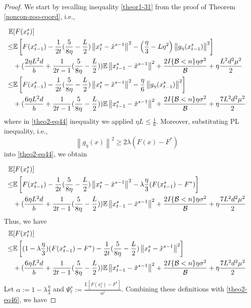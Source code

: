 \documentclass{article}
\newcommand*{\E}{\mathbb{E}}
\newcommand{\norm}[1]{\left\lVert#1\right\rVert}
\theoremstyle{definition}
\theoremstyle{remark}
\begin{document}
\begin{proof}
We start by recalling inequality \eqref{theor1-31} from the proof of Theorem \ref{noncon-zoo-coord}, i.e.,

\begin{align} 
\E&[F({x}_{t}^s)] \notag
\\ \leq& \E\left[F({x}_{t-1}^s)  -\frac{1}{2t}(\frac{5}{8\eta} - \frac{L}{2})\norm{{x}_t^s-\tilde{x}^{s-1}}^2- \left(\frac{\eta}{3}-L\eta^2\right)\norm{g_{\eta}(x_{t-1}^s)}^2\right]\notag\\
&+(\frac{2\eta L^2 d}{b}+\frac{1}{2t-1}(\frac{5}{8\eta} - \frac{L}{2}))\E\norm{x_{t-1}^s-\tilde{x}^{s-1}}^2
+ \frac{2I\{\mathcal{B} < n\}\eta \sigma ^2}{\mathcal{B}}+\eta \frac{L^2 d^2 \mu^2}{2}\notag
\\ \leq& \E\left[F({x}_{t-1}^s)  -\frac{1}{2t}(\frac{5}{8\eta} - \frac{L}{2})\norm{{x}_t^s-\tilde{x}^{s-1}}^2- \frac{\eta}{6}\norm{g_{\eta}(x_{t-1}^s)}^2\right]\notag\\
&+(\frac{6\eta L^2 d}{b}+\frac{1}{2t-1}(\frac{5}{8\eta} - \frac{L}{2}))\E\norm{x_{t-1}^s-\tilde{x}^{s-1}}^2
+ \frac{2I\{\mathcal{B} < n\}\eta \sigma ^2}{\mathcal{B}}+\eta \frac{7 L^2 d^2 \mu^2}{2}\label{theo2-eq44}
 \end{align}
 where in \eqref{theo2-eq44} inequality we applied $\eta L \leq \frac{1}{6}$.
Moreover, substituting PL inequality, i.e., 
\begin{equation}
\norm{g_{\eta}(x)}^2 \geq 2\lambda (F(x) - F^*)
\end{equation}
into \eqref{theo2-eq44}, we obtain

\begin{align} 
\E&[F({x}_{t}^s)] \notag
\\ \leq& \E\left[F({x}_{t-1}^s)  -\frac{1}{2t}(\frac{5}{8\eta} - \frac{L}{2})\norm{{x}_t^s-\tilde{x}^{s-1}}^2- \lambda\frac{\eta}{3}(F({x}_{t-1}^s) - F^*) \right]\notag\\
&+(\frac{6\eta L^2 d}{b}+\frac{1}{2t-1}(\frac{5}{8\eta} - \frac{L}{2}))\E\norm{x_{t-1}^s-\tilde{x}^{s-1}}^2
+ \frac{2I\{\mathcal{B} < n\}\eta \sigma ^2}{\mathcal{B}}+\eta \frac{7 L^2 d^2 \mu^2}{2}
 \end{align}
Thus, we have
\begin{align} 
\E&[F({x}_{t}^s)] \notag
\\ \leq& \E\left[ (1-\lambda\frac{\eta}{3})(F({x}_{t-1}^s) - F^*)   -\frac{1}{2t}(\frac{5}{8\eta} - \frac{L}{2})\norm{{x}_t^s-\tilde{x}^{s-1}}^2\right]\notag\\
&+(\frac{6 \eta L^2 d}{b}+\frac{1}{2t-1}(\frac{5}{8\eta} - \frac{L}{2}))\E\norm{x_{t-1}^s-\tilde{x}^{s-1}}^2
+ \frac{2I\{\mathcal{B} < n\}\eta \sigma ^2}{\mathcal{B}}+\eta \frac{7 L^2 d^2 \mu^2}{2}\label{theo2-eq46}
 \end{align}
Let $\alpha := 1 - \lambda\frac{\eta}{3}$ and $\Psi_t^s := \frac{\E[F({x}_{t}^s)-F^*]}{\alpha^t}$. Combining these definitions with \eqref{theo2-eq46}, we have  


\end{proof}
\end{document}
